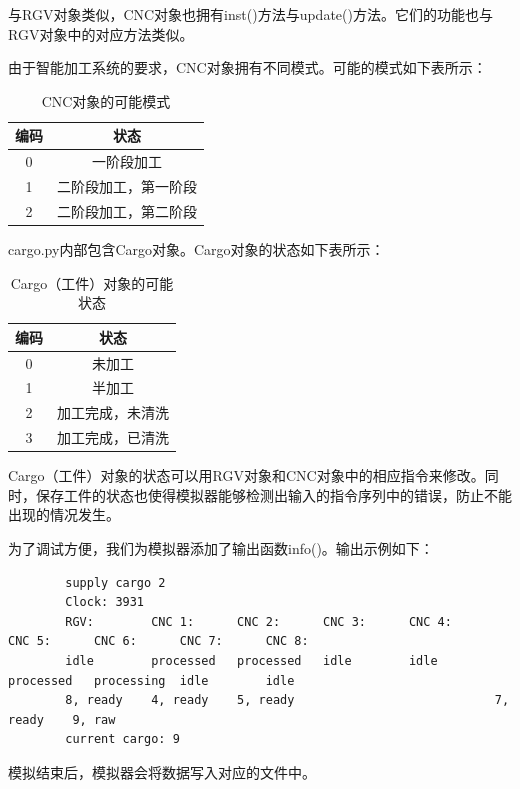 \documentclass{cumcmthesis}
\begin{document}
	与RGV对象类似，CNC对象也拥有inst()方法与update()方法。它们的功能也与RGV对象中的对应方法类似。
	
	由于智能加工系统的要求，CNC对象拥有不同模式。可能的模式如下表所示：
	\begin{table}[!htbp]
		\centering
		\begin{tabular}{c|c}
			\toprule[1.5pt]
			编码 & 状态 \\
			\midrule[1.5pt]
			0 & 一阶段加工 \\
			1 & 二阶段加工，第一阶段\\
			2 & 二阶段加工，第二阶段\\
			\bottomrule[1.5pt]
		\end{tabular}
		\caption{CNC对象的可能模式}
	\end{table}
	
	cargo.py内部包含Cargo对象。Cargo对象的状态如下表所示：
	\begin{table}[!htbp]
		\centering
		\begin{tabular}{c|c}
			\toprule[1.5pt]
			编码 & 状态 \\
			\midrule[1.5pt]
			0 & 未加工 \\
			1 & 半加工\\
			2 & 加工完成，未清洗\\
			3 & 加工完成，已清洗\\
			\bottomrule[1.5pt]
		\end{tabular}
		\caption{Cargo（工件）对象的可能状态}
	\end{table}
	Cargo（工件）对象的状态可以用RGV对象和CNC对象中的相应指令来修改。同时，保存工件的状态也使得模拟器能够检测出输入的指令序列中的错误，防止不能出现的情况发生。
	
	为了调试方便，我们为模拟器添加了输出函数info()。输出示例如下：
	
	\begin{lstlisting}
		supply cargo 2
		Clock: 3931
		RGV:        CNC 1:      CNC 2:      CNC 3:      CNC 4:      CNC 5:      CNC 6:      CNC 7:      CNC 8:
		idle        processed   processed   idle        idle        processed   processing  idle        idle
		8, ready    4, ready    5, ready                            7, ready    9, raw
		current cargo: 9
	\end{lstlisting}
	
	模拟结束后，模拟器会将数据写入对应的文件中。
	
\end{document}
